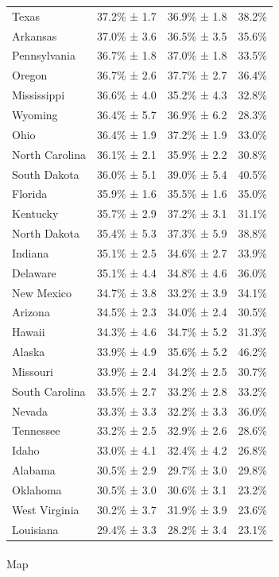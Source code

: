 \documentclass[
  letterpaper,
  DIV=11,
  numbers=noendperiod]{scrartcl}
\makeatletter
\let\oldparagraph\paragraph
\renewcommand{\paragraph}{
    \@ifstar
      \xxxParagraphStar
      \xxxParagraphNoStar
  }
\newcommand{\xxxParagraphStar}[1]{\oldparagraph*{#1}\mbox{}}
\newcommand{\xxxParagraphNoStar}[1]{\oldparagraph{#1}\mbox{}}
\makeatother
\begin{document}
\begin{longtable}[]{@{}llll@{}}
Texas & 37.2\% ± 1.7 & 36.9\% ± 1.8 & 38.2\% \\
Arkansas & 37.0\% ± 3.6 & 36.5\% ± 3.5 & 35.6\% \\
Pennsylvania & 36.7\% ± 1.8 & 37.0\% ± 1.8 & 33.5\% \\
Oregon & 36.7\% ± 2.6 & 37.7\% ± 2.7 & 36.4\% \\
Mississippi & 36.6\% ± 4.0 & 35.2\% ± 4.3 & 32.8\% \\
Wyoming & 36.4\% ± 5.7 & 36.9\% ± 6.2 & 28.3\% \\
Ohio & 36.4\% ± 1.9 & 37.2\% ± 1.9 & 33.0\% \\
North Carolina & 36.1\% ± 2.1 & 35.9\% ± 2.2 & 30.8\% \\
South Dakota & 36.0\% ± 5.1 & 39.0\% ± 5.4 & 40.5\% \\
Florida & 35.9\% ± 1.6 & 35.5\% ± 1.6 & 35.0\% \\
Kentucky & 35.7\% ± 2.9 & 37.2\% ± 3.1 & 31.1\% \\
North Dakota & 35.4\% ± 5.3 & 37.3\% ± 5.9 & 38.8\% \\
Indiana & 35.1\% ± 2.5 & 34.6\% ± 2.7 & 33.9\% \\
Delaware & 35.1\% ± 4.4 & 34.8\% ± 4.6 & 36.0\% \\
New Mexico & 34.7\% ± 3.8 & 33.2\% ± 3.9 & 34.1\% \\
Arizona & 34.5\% ± 2.3 & 34.0\% ± 2.4 & 30.5\% \\
Hawaii & 34.3\% ± 4.6 & 34.7\% ± 5.2 & 31.3\% \\
Alaska & 33.9\% ± 4.9 & 35.6\% ± 5.2 & 46.2\% \\
Missouri & 33.9\% ± 2.4 & 34.2\% ± 2.5 & 30.7\% \\
South Carolina & 33.5\% ± 2.7 & 33.2\% ± 2.8 & 33.2\% \\
Nevada & 33.3\% ± 3.3 & 32.2\% ± 3.3 & 36.0\% \\
Tennessee & 33.2\% ± 2.5 & 32.9\% ± 2.6 & 28.6\% \\
Idaho & 33.0\% ± 4.1 & 32.4\% ± 4.2 & 26.8\% \\
Alabama & 30.5\% ± 2.9 & 29.7\% ± 3.0 & 29.8\% \\
Oklahoma & 30.5\% ± 3.0 & 30.6\% ± 3.1 & 23.2\% \\
West Virginia & 30.2\% ± 3.7 & 31.9\% ± 3.9 & 23.6\% \\
Louisiana & 29.4\% ± 3.3 & 28.2\% ± 3.4 & 23.1\% \\
\end{longtable}

\paragraph{Map}\label{map}
\end{document}
